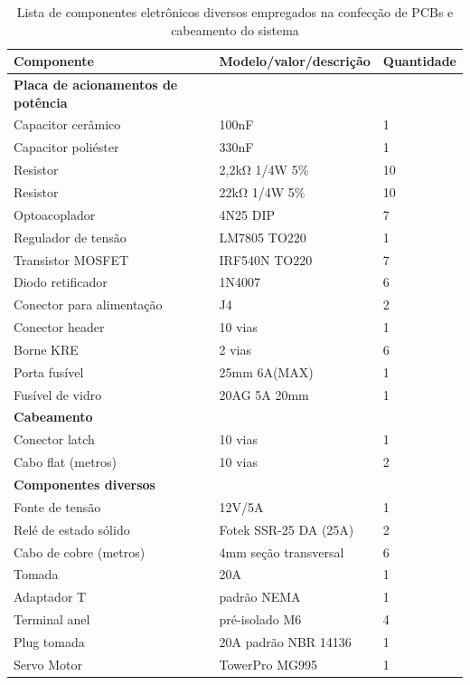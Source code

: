 \begin{center}
	\begin{table}[H]
		\captionsetup{justification=centering}
		\caption[Lista de componentes eletrônicos diversos empregados na confecção de PCBs e cabeamento do sistema]{Lista de componentes eletrônicos diversos empregados na confecção de PCBs e cabeamento do sistema}
		\label{bom_eln}
		\begin{tabular}{ | M{6.5cm} | M{6.5cm} | M{2cm} |}
			\hline
			\textbf{Componente} & \textbf{Modelo/valor/descrição} & \textbf{Quantidade} \\ \hline
			
			\textbf{Placa de acionamentos de potência} & & \\ \hline
			Capacitor cerâmico & 100nF & 1\\ \hline
			Capacitor poliéster & 330nF & 1\\ \hline
			Resistor & 2,2k\si{\ohm} 1/4W 5\% & 10\\ \hline
			Resistor & 22k\si{\ohm} 1/4W 5\% & 10\\ \hline
			Optoacoplador & 4N25 DIP & 7\\ \hline
			Regulador de tensão & LM7805 TO220 & 1\\ \hline
			Transistor MOSFET & IRF540N TO220 & 7\\ \hline
			Diodo retificador & 1N4007 & 6\\ \hline
			Conector para alimentação & J4 & 2\\ \hline
			Conector header & 10 vias & 1\\ \hline
			Borne KRE & 2 vias & 6\\ \hline
			Porta fusível & 25mm 6A(MAX) & 1\\ \hline
			Fusível de vidro & 20AG 5A 20mm & 1\\ \hline
			
			\textbf{Cabeamento} & & \\ \hline
			Conector latch & 10 vias & 1\\ \hline
			Cabo flat (metros) & 10 vias & 2\\ \hline
			
			\textbf{Componentes diversos} & & \\ \hline
			Fonte de tensão & 12V/5A & 1\\ \hline
			Relé de estado sólido & Fotek SSR-25 DA (25A) & 2\\ \hline
			Cabo de cobre (metros) & 4mm seção transversal & 6\\ \hline
			Tomada & 20A & 1\\ \hline
			Adaptador T & padrão NEMA & 1\\ \hline
			Terminal anel & pré-isolado M6 & 4\\ \hline
			Plug tomada & 20A padrão NBR 14136 & 1\\ \hline
			Servo Motor & TowerPro MG995 & 1\\ \hline
			
		\end{tabular}
	\end{table}
\end{center}

